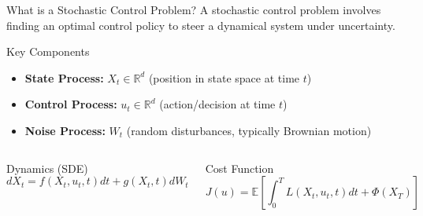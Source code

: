 \documentclass[aspectratio=169,xcolor=dvipsnames]{beamer}
\begin{document}
\begin{frame}{What is a Stochastic Control Problem?}
    A stochastic control problem involves finding an optimal control policy to steer a dynamical system under uncertainty.
    
    \vspace{0.3cm}
    
    \begin{block}{Key Components}
        \begin{itemize}
            \item \textbf{State Process:} $X_t \in \mathbb{R}^d$ (position in state space at time $t$)
            \item \textbf{Control Process:} $u_t \in \mathbb{R}^d$ (action/decision at time $t$)
            \item \textbf{Noise Process:} $W_t$ (random disturbances, typically Brownian motion)
        \end{itemize}
    \end{block}
    
    \begin{columns}[t]
        \begin{alertblock}{Dynamics (SDE)}
            \vspace{-0.1cm}
            \begin{equation}
            dX_t = f(X_t, u_t, t) dt + g(X_t, t) dW_t
            \end{equation}
            \vspace{-0.2cm}
        \end{alertblock}
        
        \begin{alertblock}{Cost Function}
            \vspace{-0.1cm}
            \begin{equation}
            J(u) = \mathbb{E}\left[\int_0^T L(X_t, u_t, t) dt + \Phi(X_T)\right]
            \end{equation}
            \vspace{-0.2cm}
        \end{alertblock}
    \end{columns}

\end{frame}
\end{document}
